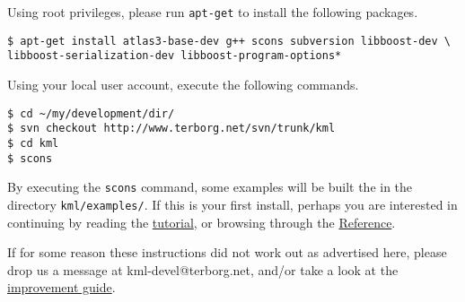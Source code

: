 \documentclass{article}
\begin{document}
Using root privileges, please run \texttt{apt-get} to install the following packages.
\begin{verbatim}
$ apt-get install atlas3-base-dev g++ scons subversion libboost-dev \ 
libboost-serialization-dev libboost-program-options*
\end{verbatim}
%
Using your local user account, execute the following commands.
\begin{verbatim}
$ cd ~/my/development/dir/
$ svn checkout http://www.terborg.net/svn/trunk/kml
$ cd kml
$ scons
\end{verbatim}
%
By executing the \texttt{scons} command, some examples will be built the in the directory \texttt{kml/examples/}.
If this is your first install, perhaps you are interested in continuing 
by reading the \href{\kmlroot/tutorial.html}{tutorial}, or browsing through 
the \href{\kmlroot/reference/}{Reference}.

If for some reason these instructions did not work out as advertised here,
please drop us a message at kml-devel@terborg.net, and/or take a look
at the \href{\kmlroot/improvement.html}{improvement guide}.


% 
% 
% 
% 
\end{document}
